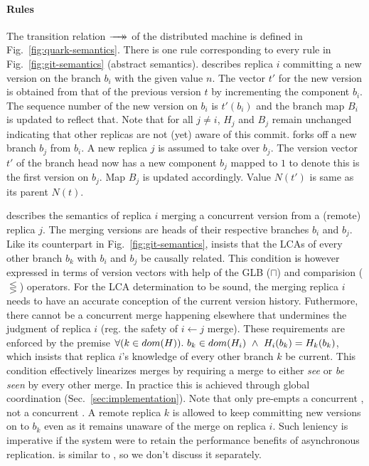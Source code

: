 \paragraph{Rules} The transition relation $\xrightarrow[]{\quad}\mathrel{\mkern-14mu}\rightarrow$ of the \quark
distributed machine is defined in Fig.~\ref{fig:quark-semantics}.
There is one rule corresponding to every rule in
Fig.~\ref{fig:git-semantics} (abstract semantics). 
describes replica $i$ committing a new version on the branch $b_i$
with the given value $n$.  The vector $t'$ for the new version is
obtained from that of the previous version $t$ by incrementing the
component $b_i$. The sequence number of the new version on $b_i$ is
$t'(b_i)$ and the branch map $B_i$ is updated to reflect that. Note
that for all $j \neq i$, $H_j$ and $B_j$ remain unchanged indicating
that other replicas are not (yet) aware of this commit.
%
 forks off a new branch $b_j$ from $b_i$. A new
replica $j$ is assumed to take over $b_j$. The version vector $t'$ of
the branch head now has a new component $b_j$ mapped to $1$ to denote
this is the first version on $b_j$. Map $B_j$ is updated accordingly.
Value $N(t')$ is same as its parent $N(t)$.

 describes the semantics of replica $i$ merging a
concurrent version from a (remote) replica $j$. The merging versions
are heads of their respective branches $b_i$ and $b_j$.  Like its
counterpart in Fig.~\ref{fig:git-semantics},  insists
that the LCAs of every other branch $b_k$ with $b_i$ and $b_j$ be
causally related. This condition is however expressed in terms of
version vectors with help of the GLB ($\sqcap$) and comparision
($\lesseqgtr$) operators. For the LCA determination to be sound,
the merging replica $i$ needs to have an accurate conception of the
current version history. Futhermore, there cannot be a concurrent
merge happening elsewhere that undermines the judgment of replica $i$
(reg. the safety of $i \leftarrow j$ merge). These requirements are
enforced by the premise $\forall (k\in dom(H)).~b_k \in dom(H_i) ~\wedge~
H_i(b_k) = H_k(b_k)$, which insists that replica $i$'s knowledge of
every other branch $k$ be current. This condition effectively
linearizes merges by requiring a merge to either \emph{see} or
\emph{be seen} by every other merge. In practice this is achieved
through global coordination (Sec.~\ref{sec:implementation}). Note that
 only pre-empts a concurrent , not a
concurrent . A remote replica $k$ is allowed to keep
committing new versions on to $b_k$ even as it remains unaware of the
merge on replica $i$. Such leniency is imperative if the system were
to retain the performance benefits of asynchronous replication.
 is similar to , so we don't
discuss it separately.


